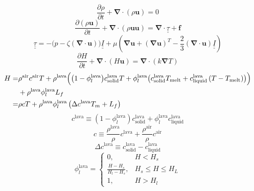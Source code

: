 \begin{equation}
    \frac{\partial \rho}{\partial t} + \bm{\nabla} \cdot \left(\rho \bm{u}\right) = 0
\end{equation}
\begin{equation}
    \frac{\partial \left(\rho \bm{u}\right)}{\partial t} + \bm{\nabla}\cdot \left(\rho \bm{u}\bm{u}\right) = \bm{\nabla} \cdot \underline{\underline{\tau}} + \bm{f}
\end{equation}
\begin{equation}
    \underline{\underline{\tau}} = -\bigl(p - \zeta \left(\bm{\nabla}\cdot \bm{u}\right)\bigr)\underline{\underline{I}} + \mu\left(\bm{\nabla}\bm{u} + \left(\bm{\nabla}\bm{u}\right)^T - \frac{2}{3}\left(\bm{\nabla}\cdot\bm{u}\right)\underline{\underline{I}}\right)
\end{equation}
\begin{equation}
    \frac{\partial H}{\partial t} + \bm{\nabla} \cdot \left(H \bm{u}\right) = \bm{\nabla}\cdot\left(k \bm{\nabla}T\right)
\end{equation}
\begin{equation}
\begin{split}
    H =& \rho^{\text{air}} c^{\text{air}} T + \rho^{\text{lava}}\Bigl(\bigl(1 - \phi_l^{\text{lava}}\bigr)c_{\text{solid}}^{\text{lava}}T + \phi_l^{\text{lava}}\bigl(c_{\text{solid}}^{\text{lava}}T_{\text{melt}} + c_{\text{liquid}}^{\text{lava}}\left(T - T_{\text{melt}}\right)\bigr)\Bigr)\\
    & + \rho^{\text{lava}} \phi_l^{\text{lava}} L_f\\
    =& \rho c T + \rho^{\text{lava}}\phi_l^{\text{lava}}\left(\Delta c^{\text{lava}} T_m + L_f\right)
\end{split}
\end{equation}
\begin{equation}
    c^{\text{lava}} \equiv \left(1 - \phi_l^{\text{lava}}\right) c^{\text{lava}}_{\text{solid}} + \phi_l^{\text{lava}}c^{\text{lava}}_{\text{liquid}}
\end{equation}
\begin{equation}
    c \equiv \frac{\rho^{\text{lava}}}{\rho}c^{\text{lava}} + \frac{\rho^{\text{air}}}{\rho}c^{\text{air}}
\end{equation}
\begin{equation}
    \Delta c^{\text{lava}}\equiv c^{\text{lava}}_{\text{solid}} - c^{\text{lava}}_{\text{liquid}}
\end{equation}
\begin{equation}
    \phi_l^{\text{lava}} = 
    \begin{cases}
        0, & H < H_s\\
        \frac{H - H_s}{H_l - H_s}, & H_s \leq H \leq H_L\\
        1, & H > H_l
    \end{cases}
\end{equation}
